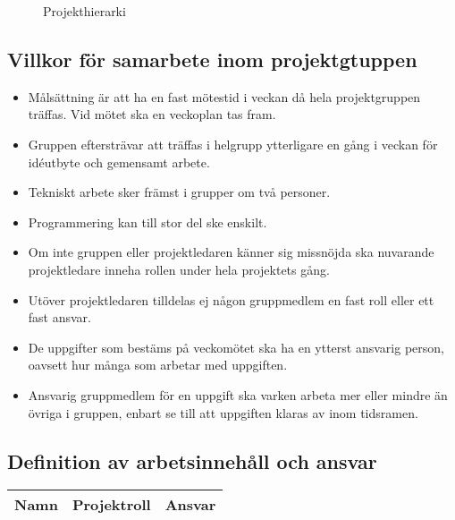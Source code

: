 \documentclass[11pt]{article}
\begin{document}
\begin{flushleft}
\begin{figure}[htbp]
\caption{Projekthierarki} \label{hierarki}

\end{figure}

\subsection{Villkor för samarbete inom projektgtuppen}
\begin{itemize}
	\item Målsättning är att ha en fast mötestid i veckan då hela projektgruppen träffas. Vid mötet ska en veckoplan tas fram.
	\item Gruppen eftersträvar att träffas i helgrupp ytterligare en gång i veckan för idéutbyte och gemensamt arbete.
	\item Tekniskt arbete sker främst i grupper om två personer.
	\item Programmering kan till stor del ske enskilt.
	\item Om inte gruppen eller projektledaren känner sig missnöjda ska nuvarande projektledare inneha rollen under hela projektets gång.
	\item Utöver projektledaren tilldelas ej någon gruppmedlem en fast roll eller ett fast ansvar.
	\item De uppgifter som bestäms på veckomötet ska ha en ytterst ansvarig person, oavsett hur många som arbetar med uppgiften.
	\item Ansvarig gruppmedlem för en uppgift ska varken arbeta mer eller mindre än övriga i gruppen, enbart se till att uppgiften klaras av inom tidsramen.
\end{itemize}

\subsection{Definition av arbetsinnehåll och ansvar}

\begin{longtable}{| p{.2\linewidth} | p{.2\linewidth} | p{.5\linewidth} |} \hline
\textbf{Namn} & \textbf{Projektroll} & \textbf{Ansvar} \\ \hline \endhead


\end{longtable}
\end{flushleft}
\end{document}
